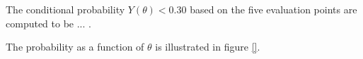 The conditional probability $Y(\theta)<0.30$ based on the five evaluation points are computed to be ... .

The probability as a function of $\theta$ is illustrated in figure \ref{}. 

